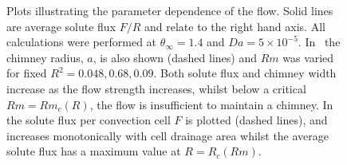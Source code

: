 \documentclass[11pt]{proc}
\begin{document}
 
  \begin{figure}[t!]
\centering
\captionsetup[subfigure]{position=top,singlelinecheck=off,justification=raggedright, aboveskip=-18pt,belowskip=0pt}
\begin{subfigure}[t]{.48\linewidth}
    \centering
    \setlength\figureheight{5cm} 
	\setlength\figurewidth{6.5cm}
	\caption{}
	 
    \label{subfig:Rm-plot}
 \end{subfigure}
 \quad
 \captionsetup[subfigure]{aboveskip=-11pt}
 \begin{subfigure}[t]{.48\linewidth}
    \centering
    \caption{}
    \setlength\figureheight{5cm} 
	\setlength\figurewidth{6.5cm}
	 
    \label{subfig:R-plot}
 \end{subfigure}
 
\setlength{\abovecaptionskip}{-10pt} %
\setlength{\belowcaptionskip}{-7pt} %
 
 \caption{Plots illustrating the parameter dependence of the flow. Solid lines are average solute flux $F/R$ and relate to the right hand axis. All calculations were performed at $\theta_\infty=1.4$ and $Da = 5\times10^{-5}$. In~ the chimney radius, $a$, is also shown (dashed lines) and $Rm$ was varied for fixed $R^2=0.048, 0.68, 0.09$. Both solute flux and chimney width increase as the flow strength increases, whilst below a critical $Rm = Rm_c(R)$, the flow is insufficient to maintain a chimney. In~ the solute flux per convection cell $F$ is plotted (dashed lines), and increases monotonically with cell drainage area whilst the average solute flux has a maximum value at $R = R_c(Rm)$.}
 \label{fig:parameter-plots}
 \end{figure}
\end{document}
